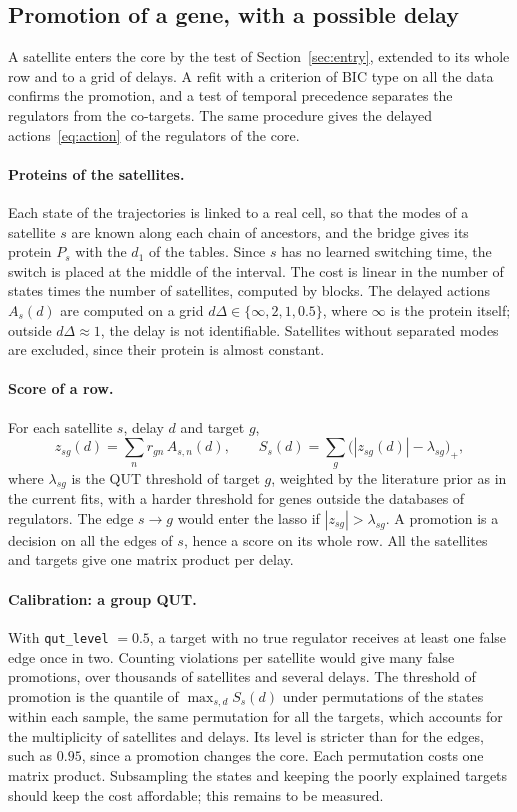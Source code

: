 \documentclass[a4paper, 11pt]{article}
\theoremstyle{plain}
\theoremstyle{remark}
\begin{document}
\subsection{Promotion of a gene, with a possible delay}\label{sec:promotion}

A satellite enters the core by the test of Section~\ref{sec:entry}, extended to its whole row and to a grid of delays. A refit with a criterion of BIC type on all the data confirms the promotion, and a test of temporal precedence separates the regulators from the co-targets. The same procedure gives the delayed actions~\eqref{eq:action} of the regulators of the core.

\paragraph{Proteins of the satellites.} Each state of the trajectories is linked to a real cell, so that the modes of a satellite $s$ are known along each chain of ancestors, and the bridge gives its protein $P_s$ with the $d_1$ of the tables. Since $s$ has no learned switching time, the switch is placed at the middle of the interval. The cost is linear in the number of states times the number of satellites, computed by blocks. The delayed actions $A_s(d)$ are computed on a grid $d\Delta \in \{\infty, 2, 1, 0.5\}$, where $\infty$ is the protein itself; outside $d\Delta \approx 1$, the delay is not identifiable. Satellites without separated modes are excluded, since their protein is almost constant.

\paragraph{Score of a row.} For each satellite $s$, delay $d$ and target $g$,
\[
z_{sg}(d) = \sum_n r_{gn}\, A_{s,n}(d), \qquad S_s(d) = \sum_g \big(|z_{sg}(d)| - \lambda_{sg}\big)_+ ,
\]
where $\lambda_{sg}$ is the QUT threshold of target $g$, weighted by the literature prior as in the current fits, with a harder threshold for genes outside the databases of regulators. The edge $s \to g$ would enter the lasso if $|z_{sg}| > \lambda_{sg}$. A promotion is a decision on all the edges of $s$, hence a score on its whole row. All the satellites and targets give one matrix product per delay.

\paragraph{Calibration: a group QUT.} With \texttt{qut\_level} $= 0.5$, a target with no true regulator receives at least one false edge once in two. Counting violations per satellite would give many false promotions, over thousands of satellites and several delays. The threshold of promotion is the quantile of $\max_{s,d} S_s(d)$ under permutations of the states within each sample, the same permutation for all the targets, which accounts for the multiplicity of satellites and delays. Its level is stricter than for the edges, such as $0.95$, since a promotion changes the core. Each permutation costs one matrix product. Subsampling the states and keeping the poorly explained targets should keep the cost affordable; this remains to be measured.
\end{document}
